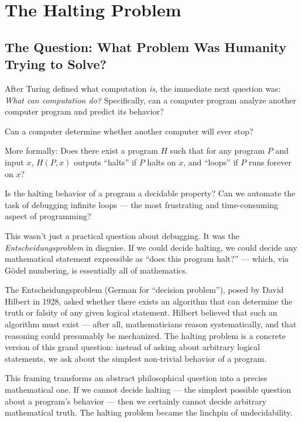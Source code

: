 
\chapter{The Halting Problem}
\label{ch:halting}

\section{The Question: What Problem Was Humanity Trying to Solve?}
\label{sec:halting:question}

After Turing defined what computation \emph{is}, the immediate next question was: \emph{What can computation do?} Specifically, can a computer program analyze another computer program and predict its behavior?

Can a computer determine whether another computer will ever stop?

More formally: Does there exist a program $H$ such that for any program $P$ and input $x$, $H(P, x)$ outputs ``halts'' if $P$ halts on $x$, and ``loops'' if $P$ runs forever on $x$?

Is the halting behavior of a program a decidable property? Can we automate the task of debugging infinite loops — the most frustrating and time-consuming aspect of programming?

This wasn't just a practical question about debugging. It was the \emph{Entscheidungsproblem} in disguise. If we could decide halting, we could decide any mathematical statement expressible as ``does this program halt?'' — which, via G\"odel numbering, is essentially all of mathematics.

The Entscheidungsproblem (German for ``decision problem''), posed by David Hilbert in 1928, asked whether there exists an algorithm that can determine the truth or falsity of any given logical statement. Hilbert believed that such an algorithm must exist — after all, mathematicians reason systematically, and that reasoning could presumably be mechanized. The halting problem is a concrete version of this grand question: instead of asking about arbitrary logical statements, we ask about the simplest non-trivial behavior of a program.

This framing transforms an abstract philosophical question into a precise mathematical one. If we cannot decide halting — the simplest possible question about a program's behavior — then we certainly cannot decide arbitrary mathematical truth. The halting problem became the linchpin of undecidability.

